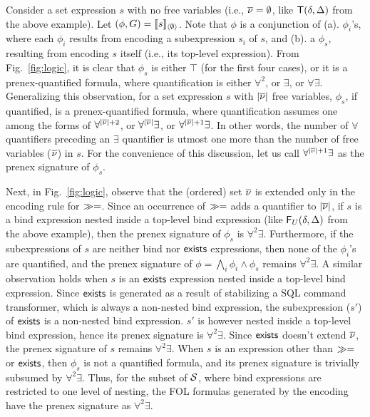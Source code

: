 Consider a set expression $s$ with no free variables (i.e., $\overline{\nu} =
\emptyset$, like ${\sf T}(\delta,\Delta)$ from the above example). Let
$(\phi,G) = \llbracket s \rrbracket_{\langle \emptyset \rangle}$. Note that $\phi$ is a conjunction
of (a).  $\phi_i$'s, where each $\phi_i$ results from encoding a
subexpression $s_i$ of $s$, and (b). a $\phi_s$, resulting from
encoding $s$ itself (i.e., its top-level expression). From Fig.~\ref{fig:logic},
it is clear that $\phi_s$ is either $\top$ (for the first four cases),
or it is a prenex-quantified formula, where quantification is either
$\forall^2$, or $\exists$, or $\forall\exists$. Generalizing this
observation, for a set expression $s$ with $|\overline{\nu}|$ free variables,
$\phi_s$, if quantified, is a prenex-quantified formula, where
quantification assumes one among the forms of $\forall^{|\overline{\nu}|+2}$,
or $\forall^{|\overline{\nu}|}\exists$, or $\forall^{|\overline{\nu}|+1}\exists$.  In
other words, the number of $\forall$ quantifiers preceding an
$\exists$ quantifier is utmost one more than the number of free
variables ($\overline{\nu}$) in $s$. For the convenience of this discussion,
let us call $\forall^{|\overline{\nu}|+1}\exists$ as the prenex signature of
$\phi_s$. 

Next, in Fig.~\ref{fig:logic}, observe that the (ordered) set $\overline{\nu}$
is extended only in the encoding rule for $\gg=$. Since an occurrence
of $\gg=$ adds a quantifier to $|\overline{\nu}|$, if $s$ is a bind
expression nested inside a top-level bind expression (like
${\sf F}_U(\delta,\Delta)$ from the above example), then the prenex signature
of $\phi_s$ is $\forall^2\exists$.  Furthermore, if the subexpressions
of $s$ are neither {bind} nor ${\sf exists}$ expressions, then none of the
$\phi_i$'s are quantified, and the prenex signature of $\phi = \bigwedge_i\phi_i \wedge \phi_s$
remains $\forall^2\exists$. A similar
observation holds when $s$ is an ${\sf exists}$ expression nested inside a
top-level {bind} expression.  Since ${\sf exists}$ is generated as a
result of stabilizing a SQL command transformer, which is always a
non-nested bind expression, the subexpression ($s'$) of ${\sf exists}$ is
a non-nested bind expression. $s'$ is however nested inside a
top-level bind expression, hence its prenex signature is
$\forall^2\exists$.  Since ${\sf exists}$ doesn't extend $\overline{\nu}$, the
prenex signature of $s$ remains $\forall^2\exists$. When $s$ is an
expression other than $\gg=$ or ${\sf exists}$, then $\phi_s$ is not a
quantified formula, and its prenex signature is trivially subsumed by
$\forall^2\exists$. Thus, for the subset of $\mathcal{S}$, where bind
expressions are restricted to one level of nesting, the FOL formulas
generated by the encoding have the prenex signature as
$\forall^2\exists$.

